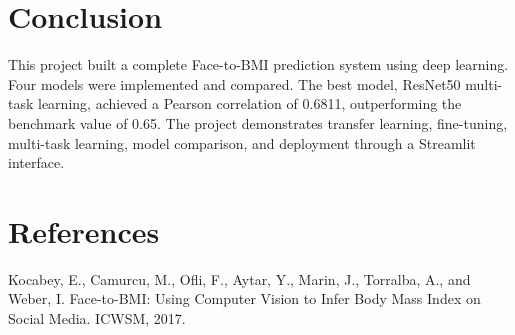 \documentclass[11pt]{article}
\begin{document}
\section{Conclusion}

This project built a complete Face-to-BMI prediction system using deep learning. Four models were implemented and compared. The best model, ResNet50 multi-task learning, achieved a Pearson correlation of 0.6811, outperforming the benchmark value of 0.65. The project demonstrates transfer learning, fine-tuning, multi-task learning, model comparison, and deployment through a Streamlit interface.

\section*{References}

Kocabey, E., Camurcu, M., Ofli, F., Aytar, Y., Marin, J., Torralba, A., and Weber, I. Face-to-BMI: Using Computer Vision to Infer Body Mass Index on Social Media. ICWSM, 2017.
\end{document}
